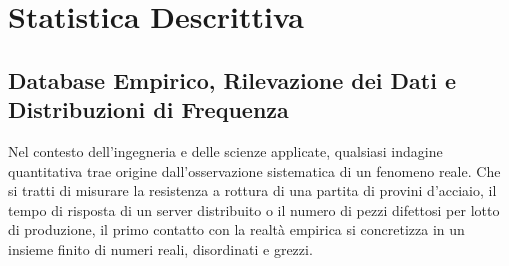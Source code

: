 \chapter{Statistica Descrittiva}
\label{chap:statistica_descrittiva}

\begin{abstract}
Il presente capitolo espone in modo rigoroso, organico e approfondito i fondamenti dell'analisi statistica descrittiva univariata e bivariata su dati empirici. Partendo dalla rilevazione del dato grezzo e dalla strutturazione delle distribuzioni di frequenza, si approfondiscono i concetti di sintesi di posizione (media aritmetica, mediana, moda e quantili) e di dispersione (varianza campionaria corretta, deviazione standard, scarto interquartile). Vengono dimostrate analiticamente le proprietà algebriche e variazionali fondamentali (tra cui il principio del baricentro, la minimizzazione $L_1$ ed $L_2$ e la correzione di Bessel per la non distorsione della varianza). Nella seconda parte, l'indagine si estende alla statistica bivariata attraverso la geometria della covarianza nei quattro quadranti baricentrici, il coefficiente di correlazione lineare di Pearson (con dimostrazione della limitatezza $[-1,1]$ mediante la disuguaglianza di Cauchy-Schwarz), la stima della retta di regressione dei minimi quadrati (OLS) e l'analisi critica delle trappole metodologiche d'esame.
\end{abstract}

\section{Database Empirico, Rilevazione dei Dati e Distribuzioni di Frequenza}
\label{sec:database_frequenze}

Nel contesto dell'ingegneria e delle scienze applicate, qualsiasi indagine quantitativa trae origine dall'osservazione sistematica di un fenomeno reale. Che si tratti di misurare la resistenza a rottura di una partita di provini d'acciaio, il tempo di risposta di un server distribuito o il numero di pezzi difettosi per lotto di produzione, il primo contatto con la realtà empirica si concretizza in un insieme finito di numeri reali, disordinati e grezzi.

